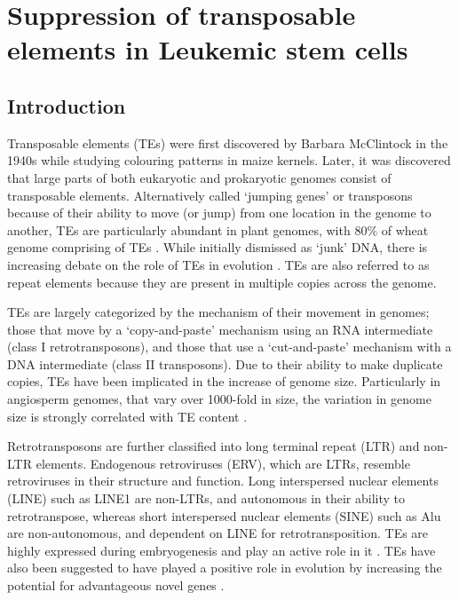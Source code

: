 \chapter{Suppression of transposable elements in Leukemic stem cells \cite{Colombo2017}}
\label{cha:research_topic_4}

\section{Introduction}
Transposable elements (TEs) were first discovered by Barbara McClintock in the 1940s while studying colouring patterns in maize kernels. Later, it was discovered that large parts of both eukaryotic and prokaryotic genomes consist of transposable elements. Alternatively called `jumping genes' or transposons because of their ability to move (or jump) from one location in the genome to another, TEs are particularly abundant in plant genomes, with 80\% of wheat genome comprising of TEs \cite{brenchly12}. While initially dismissed as `junk' DNA, there is increasing debate on the role of TEs in evolution \cite{chuong16,lisch13}. TEs are also referred to as repeat elements because they are present in multiple copies across the genome. 

TEs are largely categorized by the mechanism of their movement in genomes; those that move by a `copy-and-paste' mechanism using an RNA intermediate (class I retrotransposons), and those that use a `cut-and-paste' mechanism with a DNA intermediate (class II transposons). Due to their ability to make duplicate copies, TEs have been implicated in the increase of genome size. Particularly in angiosperm genomes, that vary over 1000-fold in size, the variation in genome size is strongly correlated with TE content \cite{tenaillon10}. 

Retrotransposons are further classified into long terminal repeat (LTR) and non-LTR elements. Endogenous retroviruses (ERV), which are LTRs, resemble retroviruses in their structure and function. Long interspersed nuclear elements (LINE) such as LINE1 are non-LTRs, and autonomous in their ability to retrotranspose, whereas short interspersed nuclear elements (SINE) such as Alu are non-autonomous, and dependent on LINE for retrotransposition. TEs are highly expressed during embryogenesis and play an active role in it \cite{Gerdes16,Ge17}. TEs have also been suggested to have played a positive role in evolution by increasing the potential for advantageous novel genes \cite{Elbarbary16, Sundaram2014,Thompson2016, Lee2015}.

